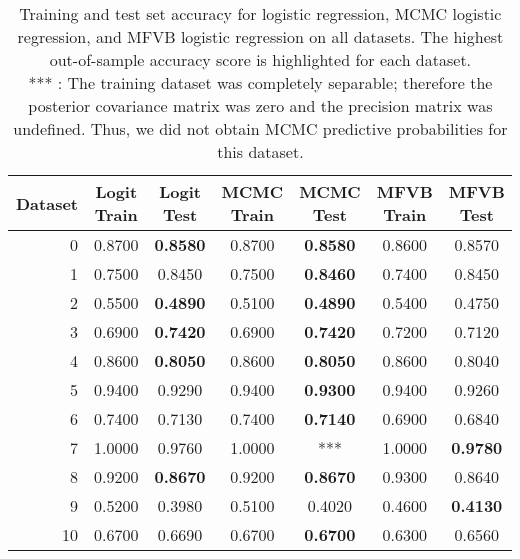 \begin{table}[tb]
\centering
\begin{tabular}{rcccccc}
  \toprule
 {\bf  Dataset} & {\bf  Logit Train} & {\bf  Logit Test} & {\bf  MCMC Train} & {\bf  MCMC Test} & {\bf  MFVB Train} & {\bf  MFVB Test}\\
  \midrule
  0 & 0.8700 & {\bf 0.8580} & 0.8700 & {\bf 0.8580} & 0.8600 & 0.8570 \\
  1 & 0.7500 & 0.8450 & 0.7500 & {\bf 0.8460} & 0.7400 & 0.8450 \\
  2 & 0.5500 & {\bf 0.4890} & 0.5100 & {\bf 0.4890} & 0.5400 & 0.4750 \\
  3 & 0.6900 & {\bf 0.7420} & 0.6900 & {\bf 0.7420} & 0.7200 & 0.7120 \\
  4 & 0.8600 & {\bf 0.8050} & 0.8600 & {\bf 0.8050} & 0.8600 & 0.8040 \\
  5 & 0.9400 & 0.9290 & 0.9400 & {\bf 0.9300} & 0.9400 & 0.9260 \\
  6 & 0.7400 & 0.7130 & 0.7400 & {\bf 0.7140} & 0.6900 & 0.6840 \\
  7 & 1.0000 & 0.9760 & 1.0000 & *** & 1.0000 & {\bf 0.9780} \\
  8 & 0.9200 & {\bf 0.8670} & 0.9200 & {\bf 0.8670} & 0.9300 & 0.8640 \\
  9 & 0.5200 & 0.3980 & 0.5100 & 0.4020 & 0.4600 & {\bf 0.4130} \\
  10 & 0.6700 & 0.6690 & 0.6700 & {\bf 0.6700} & 0.6300 & 0.6560 \\
  \bottomrule
\end{tabular}
\caption{Training and test set accuracy for logistic regression, MCMC logistic regression, and MFVB logistic regression on all datasets.  The highest out-of-sample accuracy score is highlighted for each dataset.  \\ *** : The training dataset was completely separable; therefore the posterior covariance matrix was zero and the precision matrix was undefined.  Thus, we did not obtain MCMC predictive probabilities for this dataset. }\label{tab:all_acc}
\end{table}
